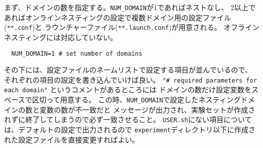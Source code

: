 まず、ドメインの数を指定する。\verb|NUM_DOMAIN|が1であればネストなし、
2以上であればオンラインネスティングの設定で複数ドメイン用の設定ファイル(\verb|**.conf|)と
ラウンチャーファイル(\verb|**.launch.conf|)が用意される。
オフラインネスティングには対応していない。
\begin{verbatim}
  NUM_DOMAIN=1 # set number of domains
\end{verbatim}

その下には、設定ファイルのネームリストで設定する項目が並んでいるので、
それぞれの項目の設定を書き込んでいけば良い。
\verb|"# required parameters for each domain"| というコメントがあるところには
ドメインの数だけ設定変数をスペースで区切って用意する。
この時、\verb|NUM_DOMAIN|で設定したネスティングドメインの数と変数の数が不一致だと
メッセージが出力され、実験セットが作成されずに終了してしまうので必ず一致させること。
\verb|USER.sh|にない項目については、デフォルトの設定で出力されるので
\verb|experiment|ディレクトリ以下に作成された設定ファイルを直接変更すればよい。


